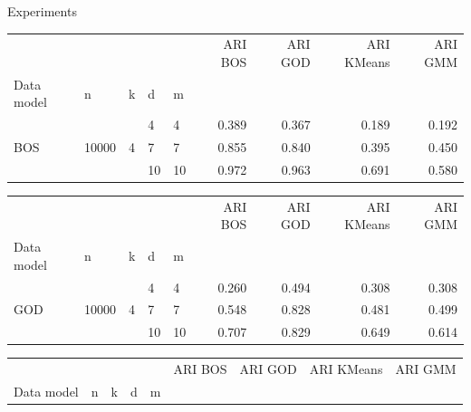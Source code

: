 \documentclass{beamer}
\begin{document}
\begin{frame}{Experiments}
{    \begin{table}[H]
        \begin{minipage}{.48\columnwidth}
        \begin{adjustbox}{width=\columnwidth}
        \begin{tabular}{lllllrrrr}
         &  &  &  &  & ARI BOS & ARI GOD & ARI KMeans & ARI GMM \\
        Data model & n & k & d & m &  &  &  &  \\
        \cline{1-9}
        \multirow[t]{3}{*}{BOS} & \multirow[t]{3}{*}{10000} & \multirow[t]{3}{*}{4} & 4 & 4 & 0.389 & 0.367 & 0.189 & 0.192 \\
        \cline{4-9}
         &  &  & 7 & 7 & 0.855 & 0.840 & 0.395 & 0.450 \\
        \cline{4-9}
         &  &  & 10 & 10 & 0.972 & 0.963 & 0.691 & 0.580 \\
        \end{tabular}
        \end{adjustbox}
        \end{minipage} \hspace{.02\columnwidth}%
        \begin{minipage}{.48\columnwidth}
        \begin{adjustbox}{width=\columnwidth}
        \begin{tabular}{lllllrrrr}
         &  &  &  &  & ARI BOS & ARI GOD & ARI KMeans & ARI GMM \\
        Data model & n & k & d & m &  &  &  &  \\
        \cline{1-9}
        \multirow[t]{3}{*}{GOD} & \multirow[t]{3}{*}{10000} & \multirow[t]{3}{*}{4} & 4 & 4 & 0.260 & 0.494 & 0.308 & 0.308 \\
        \cline{4-9}
         &  &  & 7 & 7 & 0.548 & 0.828 & 0.481 & 0.499 \\
        \cline{4-9}
         &  &  & 10 & 10 & 0.707 & 0.829 & 0.649 & 0.614 \\
        \end{tabular}
        \end{adjustbox}
        \end{minipage}
        \begin{minipage}{.48\columnwidth}
        \begin{adjustbox}{width=\columnwidth}
        \begin{tabular}{lllllrrrr}
         &  &  &  &  & ARI BOS & ARI GOD & ARI KMeans & ARI GMM \\
        Data model & n & k & d & m &  &  &  &  \\

\end{tabular}
\end{adjustbox}
\end{minipage}
\end{table}}
\end{frame}
\end{document}
